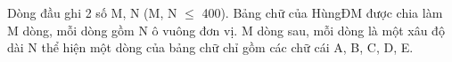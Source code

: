 Dòng đầu ghi 2 số M, N (M, N  $\le$  400). Bảng chữ của HùngĐM được chia làm M dòng, mỗi dòng gồm N ô vuông đơn vị. M dòng sau, mỗi dòng là một xâu độ dài N thể hiện một dòng của bảng chữ chỉ gồm các chữ cái A, B, C, D, E.